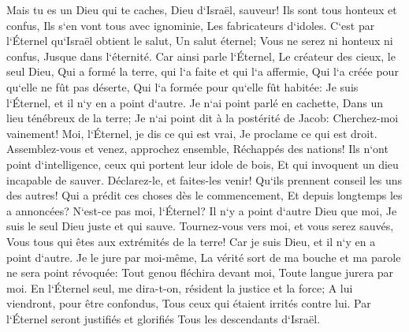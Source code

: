 \verse Mais tu es un Dieu qui te caches, Dieu d`Israël, sauveur! 
\verse Ils sont tous honteux et confus, Ils s`en vont tous avec ignominie, Les fabricateurs d`idoles. 
\verse C`est par l`Éternel qu`Israël obtient le salut, Un salut éternel; Vous ne serez ni honteux ni confus, Jusque dans l`éternité. 
\verse Car ainsi parle l`Éternel, Le créateur des cieux, le seul Dieu, Qui a formé la terre, qui l`a faite et qui l`a affermie, Qui l`a créée pour qu`elle ne fût pas déserte, Qui l`a formée pour qu`elle fût habitée: Je suis l`Éternel, et il n`y en a point d`autre. 
\verse Je n`ai point parlé en cachette, Dans un lieu ténébreux de la terre; Je n`ai point dit à la postérité de Jacob: Cherchez-moi vainement! Moi, l`Éternel, je dis ce qui est vrai, Je proclame ce qui est droit. 
\verse Assemblez-vous et venez, approchez ensemble, Réchappés des nations! Ils n`ont point d`intelligence, ceux qui portent leur idole de bois, Et qui invoquent un dieu incapable de sauver. 
\verse Déclarez-le, et faites-les venir! Qu`ils prennent conseil les uns des autres! Qui a prédit ces choses dès le commencement, Et depuis longtemps les a annoncées? N`est-ce pas moi, l`Éternel? Il n`y a point d`autre Dieu que moi, Je suis le seul Dieu juste et qui sauve. 
\verse Tournez-vous vers moi, et vous serez sauvés, Vous tous qui êtes aux extrémités de la terre! Car je suis Dieu, et il n`y en a point d`autre. 
\verse Je le jure par moi-même, La vérité sort de ma bouche et ma parole ne sera point révoquée: Tout genou fléchira devant moi, Toute langue jurera par moi. 
\verse En l`Éternel seul, me dira-t-on, résident la justice et la force; A lui viendront, pour être confondus, Tous ceux qui étaient irrités contre lui. 
\verse Par l`Éternel seront justifiés et glorifiés Tous les descendants d`Israël. 

